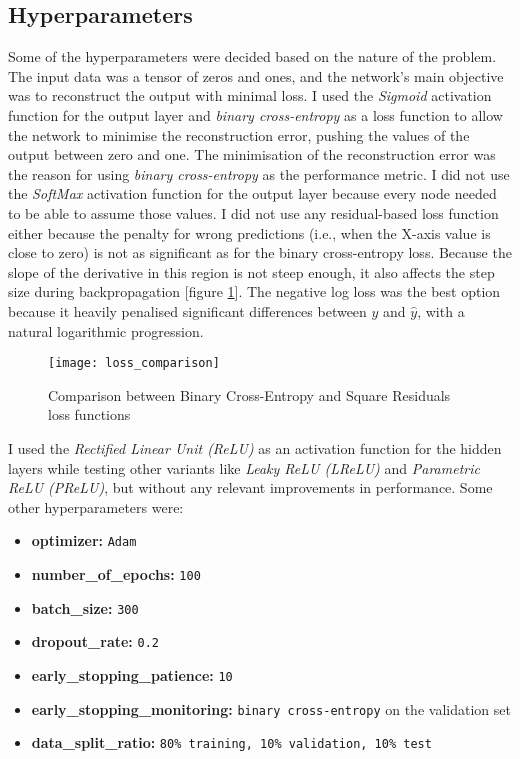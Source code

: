 \subsection{Hyperparameters}

Some of the hyperparameters were decided based on the nature of the problem.
The input data was a tensor of zeros and ones, and the network's main objective was to reconstruct the output with minimal loss.
I used the \textit{Sigmoid} activation function for the output layer and \textit{binary cross-entropy} as a loss function
to allow the network to minimise the reconstruction error, pushing the values of the output between zero and one.
The minimisation of the reconstruction error was the reason for using \textit{binary cross-entropy} as the performance metric.
I did not use the \textit{SoftMax} activation function for the output layer because every node needed to be able to assume those values.
I did not use any residual-based loss function either because the penalty for wrong predictions
(i.e., when the X-axis value is close to zero) is not as significant as for the binary cross-entropy loss.
Because the slope of the derivative in this region is not steep enough, it also affects the step size during backpropagation [figure \ref{fig:loss_comparison}].
The negative log loss was the best option because it heavily penalised significant differences between $y$ and $\hat{y}$,
with a natural logarithmic progression.

\begin{figure}[H]
  \centering
  \texttt{[image: loss\_comparison]}
  \caption{Comparison between Binary Cross-Entropy and Square Residuals loss functions}
  \label{fig:loss_comparison}
\end{figure}

I used the \textit{Rectified Linear Unit (ReLU)} as an activation function for the hidden layers
while testing other variants like \textit{Leaky ReLU (LReLU)} and \textit{Parametric ReLU (PReLU)},
but without any relevant improvements in performance.
Some other hyperparameters were:

\begin{itemize}
  \item \textbf{optimizer:} \verb|Adam|
  \item \textbf{number\_of\_epochs:} \verb|100|
  \item \textbf{batch\_size:} \verb|300|
  \item \textbf{dropout\_rate:} \verb|0.2|
  \item \textbf{early\_stopping\_patience:} \verb|10|
  \item \textbf{early\_stopping\_monitoring:} \verb|binary cross-entropy| on the validation set
  \item \textbf{data\_split\_ratio:} \verb|80% training, 10% validation, 10% test|
\end{itemize}

